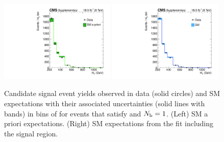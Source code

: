 \clearpage
\begin{figure}[h!]
  \begin{center}
    \includegraphics[width=0.49\textwidth,page=2]{figures/fit_result/bestFit_2012dev_RQcdZero_fZinvAll_1b_le3j-12p_smOnly} 
    \includegraphics[width=0.49\textwidth,page=2]{figures/fit_result/bestFit_2012dev_RQcdZero_fZinvAll_1b_le3j-12hp_smOnly} \\
    \caption{\label{fig:best-fit-0b} Candidate signal event yields
      observed in data (solid circles) and SM expectations with their
      associated uncertainties (solid lines with bands) in bins of
      \scalht for events that satisfy \njetlow and $N_{\text{b}} = 1$. (Left)
      SM a priori expectations. (Right) SM expectations from the fit
      including the signal region. }
  \end{center}
\end{figure}

